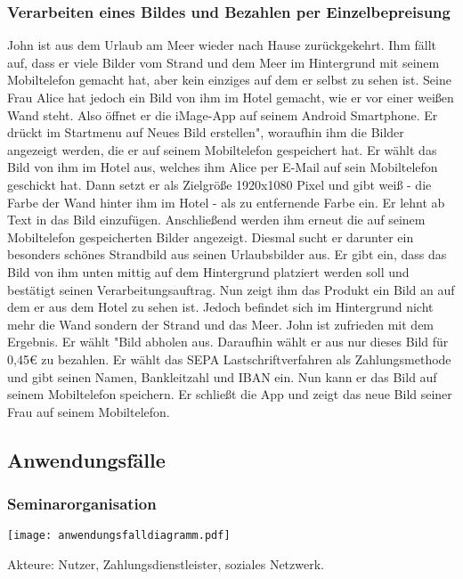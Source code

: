 \documentclass[parskip=full]{scrartcl}
\begin{document}
\subsubsection{Verarbeiten eines Bildes und Bezahlen per Einzelbepreisung}
John ist aus dem Urlaub am Meer wieder nach Hause zurückgekehrt. Ihm fällt auf, dass er viele Bilder vom Strand und dem Meer im Hintergrund mit seinem Mobiltelefon gemacht hat, aber kein einziges auf dem er selbst zu sehen ist. Seine Frau Alice hat jedoch ein Bild von ihm im Hotel gemacht, wie er vor einer weißen Wand steht. Also öffnet er die iMage-App auf seinem Android Smartphone. Er drückt im Startmenu auf \grqq{}Neues Bild erstellen", woraufhin ihm die Bilder angezeigt werden, die er auf seinem Mobiltelefon gespeichert hat. Er wählt das Bild von ihm im Hotel aus, welches ihm Alice per E-Mail auf sein Mobiltelefon geschickt hat. Dann setzt er als Zielgröße 1920x1080 Pixel und gibt weiß - die Farbe der Wand hinter ihm im Hotel - als zu entfernende Farbe ein. Er lehnt ab Text in das Bild einzufügen. Anschließend werden ihm erneut die auf seinem Mobiltelefon gespeicherten Bilder angezeigt. Diesmal sucht er darunter ein besonders schönes Strandbild aus seinen Urlaubsbilder aus. Er gibt ein, dass das Bild von ihm unten mittig auf dem Hintergrund platziert werden soll und bestätigt seinen Verarbeitungsauftrag. Nun zeigt ihm das Produkt ein Bild an auf dem er aus dem Hotel zu sehen ist. Jedoch befindet sich im Hintergrund nicht mehr die Wand sondern der Strand und das Meer. John ist zufrieden mit dem Ergebnis. Er wählt "Bild abholen\grqq{}  aus. Daraufhin wählt er aus nur dieses Bild für 0,45€ zu bezahlen. Er wählt das SEPA Lastschriftverfahren als Zahlungsmethode und gibt seinen Namen, Bankleitzahl und IBAN ein. Nun kann er das Bild auf seinem Mobiltelefon speichern. Er schließt die App und zeigt das neue Bild seiner Frau auf seinem Mobiltelefon.

\subsection{Anwendungsfälle}
\subsubsection{Seminarorganisation}
\begin{center}
\texttt{[image: anwendungsfalldiagramm.pdf]}
\end{center}

Akteure: Nutzer, Zahlungsdienstleister, soziales Netzwerk.
\end{document}
